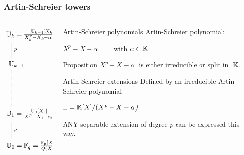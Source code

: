 \documentclass[10pt,usepdftitle=false]{beamer}
\begin{document}

\begin{frame}
  \frametitle{Artin-Schreier towers}

  \begin{columns}
    \begin{column}{0.3\textwidth}
      \Large\[\xymatrix{
        *+[r]{\U_k = \frac{\U_{k-1}[X_k]}{X_k^p-X_k-\alpha_{k-1}}}\ar@{-}[d]^p\\
        *+[r]{\U_{k-1}} \ar@{--}[dd]\\
        \\
        *+[r]{\U_{1} = \frac{\U_0[X_1]}{X_1^p-X_1-\alpha_0}} \ar@{-}[d]^p\\
        *+[r]{\U_{0} = \F_q = \frac{\F_p[X_0]}{Q(X_0)}}
      }\]
    \end{column}
    \begin{column}{0.65\textwidth}
      \begin{block}{Artin-Schreier polynomials}
        Artin-Schreier polynomial: 
        \begin{center}
          \emph{\large$X^p - X - \alpha\qquad$} with $\alpha\in\mathbb{K}$
        \end{center}
      \end{block}
      
      \begin{block}{Proposition}
        $X^p-X-\alpha\;$ is either irreducible or split in $\;\mathbb{K}$.
      \end{block}

      \begin{block}{Artin-Schreier extensions}
        Defined by an irreducible Artin-Schreier polynomial
        \begin{center}
          \large\emph{$\mathbb{L} = \mathbb{K}[X]/(X^p - X - \alpha$)}
        \end{center}
        \alert{ANY} separable extension of degree $p$ can be expressed
        this way.
      \end{block}
    \end{column}
  \end{columns}
\end{frame}

\end{document}
